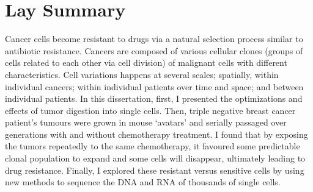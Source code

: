 

 \chapter{Lay Summary}

Cancer cells become resistant to drugs via a natural selection process similar to antibiotic resistance. Cancers are composed of various cellular clones (groups of cells related to each other via cell division) of malignant cells with different characteristics. Cell variations happens at several scales; spatially, within individual cancers; within individual patients over time and space; and between individual patients. In this dissertation, first, I presented the optimizations and effects of tumor digestion into single cells. Then, triple negative breast cancer patient's tumours were grown in mouse `avatars' and serially passaged over generations with and without chemotherapy treatment. I found that by exposing the tumors repeatedly to the same chemotherapy, it favoured some predictable clonal population to expand and some cells will disappear, ultimately leading to drug resistance. Finally, I explored these resistant versus sensitive cells by using new methods to sequence the DNA and RNA of thousands of single cells.




